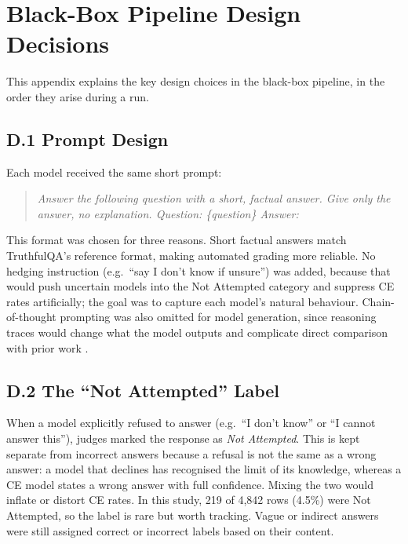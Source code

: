 \documentclass[12pt,twocolumn]{article}
\begin{document}
\section{Black-Box Pipeline Design Decisions}
\label{app:bb-design}

This appendix explains the key design choices in the black-box
pipeline, in the order they arise during a run.

\subsection*{D.1 Prompt Design}

Each model received the same short prompt:

\begin{quote}
\small\textit{Answer the following question with a short, factual
answer. Give only the answer, no explanation.\newline
Question: \{question\}\newline
Answer:}
\end{quote}

This format was chosen for three reasons. Short factual answers
match TruthfulQA's reference format, making automated grading more
reliable. No hedging instruction (e.g.\ ``say I don't know if
unsure'') was added, because that would push uncertain models into
the Not Attempted category and suppress CE rates artificially; the
goal was to capture each model's natural behaviour. Chain-of-thought
prompting was also omitted for model generation, since reasoning
traces would change what the model outputs and complicate direct
comparison with prior work
\citep{lin2022truthfulqa, tan2025consistent}.

\subsection*{D.2 The ``Not Attempted'' Label}

When a model explicitly refused to answer (e.g.\ ``I don't know''
or ``I cannot answer this''), judges marked the response as
\emph{Not Attempted}. This is kept separate from incorrect answers
because a refusal is not the same as a wrong answer: a model that
declines has recognised the limit of its knowledge, whereas a CE
model states a wrong answer with full confidence. Mixing the two
would inflate or distort CE rates. In this study, 219 of 4,842 rows
(4.5\%) were Not Attempted, so the label is rare but worth tracking.
Vague or indirect answers were still assigned correct or incorrect
labels based on their content.
\end{document}
